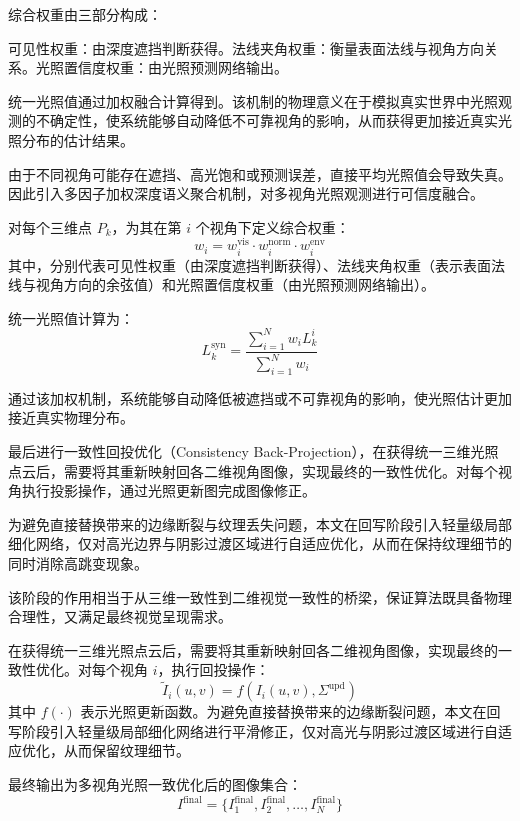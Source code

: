 综合权重由三部分构成：

可见性权重：由深度遮挡判断获得。法线夹角权重：衡量表面法线与视角方向关系。光照置信度权重：由光照预测网络输出。

统一光照值通过加权融合计算得到。该机制的物理意义在于模拟真实世界中光照观测的不确定性，使系统能够自动降低不可靠视角的影响，从而获得更加接近真实光照分布的估计结果。

由于不同视角可能存在遮挡、高光饱和或预测误差，直接平均光照值会导致失真。因此引入多因子加权深度语义聚合机制，对多视角光照观测进行可信度融合。

对每个三维点 \(P_k\)，为其在第 \(i\) 个视角下定义综合权重：
\begin{equation}
w_i = w_i^{\text{vis}} \cdot w_i^{\text{norm}} \cdot w_i^{\text{env}}
\end{equation}
其中，分别代表可见性权重（由深度遮挡判断获得）、法线夹角权重（表示表面法线与视角方向的余弦值）和光照置信度权重（由光照预测网络输出）。

统一光照值计算为：
\begin{equation}
L_k^{\text{syn}} = \frac{\sum_{i=1}^{N} w_i L_k^i}{\sum_{i=1}^{N} w_i}
\end{equation}

通过该加权机制，系统能够自动降低被遮挡或不可靠视角的影响，使光照估计更加接近真实物理分布。

最后进行一致性回投优化（Consistency Back-Projection），在获得统一三维光照点云后，需要将其重新映射回各二维视角图像，实现最终的一致性优化。对每个视角执行投影操作，通过光照更新图完成图像修正。

为避免直接替换带来的边缘断裂与纹理丢失问题，本文在回写阶段引入轻量级局部细化网络，仅对高光边界与阴影过渡区域进行自适应优化，从而在保持纹理细节的同时消除高跳变现象。

该阶段的作用相当于从三维一致性到二维视觉一致性的桥梁，保证算法既具备物理合理性，又满足最终视觉呈现需求。

在获得统一三维光照点云后，需要将其重新映射回各二维视角图像，实现最终的一致性优化。对每个视角 \(i\)，执行回投操作：
\begin{equation}
\tilde{I}_i(u, v) = f(I_i(u, v), \Sigma^{\text{upd}})
\end{equation}
其中 \(f(\cdot)\) 表示光照更新函数。为避免直接替换带来的边缘断裂问题，本文在回写阶段引入轻量级局部细化网络进行平滑修正，仅对高光与阴影过渡区域进行自适应优化，从而保留纹理细节。

最终输出为多视角光照一致优化后的图像集合：
\begin{equation}
I^{\text{final}} = \{I_1^{\text{final}}, I_2^{\text{final}}, \dots, I_N^{\text{final}}\}
\end{equation}

